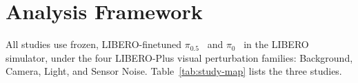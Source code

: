 \section{Analysis Framework}
\label{sec:setup}
All studies use frozen, LIBERO-finetuned $\pi_{0.5}$~\cite{pi05} and $\pi_0$~\cite{pi0} in the LIBERO simulator, under the four LIBERO-Plus visual perturbation families: Background, Camera, Light, and Sensor Noise. Table~\ref{tab:study-map} lists the three studies.

